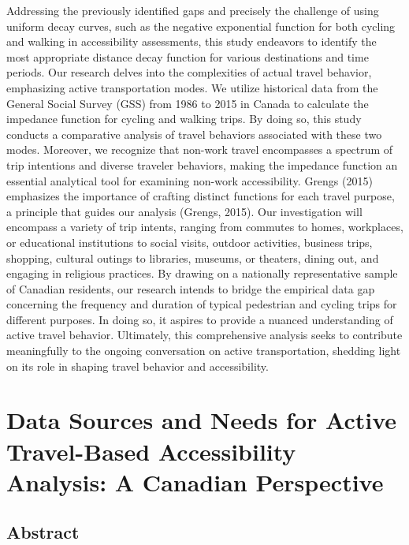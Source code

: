 \documentclass[
11pt, %
oneside, %
english, %
singlespacing, %
]{macthesis} %
\begin{document}
Addressing the previously identified gaps and precisely the challenge of using uniform decay curves, such as the negative exponential function for both cycling and walking in accessibility assessments, this study endeavors to identify the most appropriate distance decay function for various destinations and time periods. Our research delves into the complexities of actual travel behavior, emphasizing active transportation modes. We utilize historical data from the General Social Survey (GSS) from 1986 to 2015 in Canada to calculate the impedance function for cycling and walking trips. By doing so, this study conducts a comparative analysis of travel behaviors associated with these two modes.
Moreover, we recognize that non-work travel encompasses a spectrum of trip intentions and diverse traveler behaviors, making the impedance function an essential analytical tool for examining non-work accessibility. Grengs (2015) emphasizes the importance of crafting distinct functions for each travel purpose, a principle that guides our analysis (Grengs, 2015). Our investigation will encompass a variety of trip intents, ranging from commutes to homes, workplaces, or educational institutions to social visits, outdoor activities, business trips, shopping, cultural outings to libraries, museums, or theaters, dining out, and engaging in religious practices. By drawing on a nationally representative sample of Canadian residents, our research intends to bridge the empirical data gap concerning the frequency and duration of typical pedestrian and cycling trips for different purposes. In doing so, it aspires to provide a nuanced understanding of active travel behavior. Ultimately, this comprehensive analysis seeks to contribute meaningfully to the ongoing conversation on active transportation, shedding light on its role in shaping travel behavior and accessibility.

\hypertarget{rmd-basics}{%
\chapter{Data Sources and Needs for Active Travel-Based Accessibility Analysis: A Canadian Perspective}\label{rmd-basics}}

\hypertarget{abstract}{%
\section{Abstract}\label{abstract}}
\end{document}
